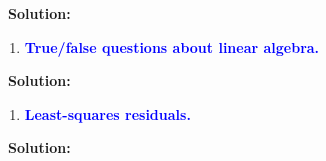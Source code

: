 \documentclass[
  11pt,
]{article}
\providecommand{\tightlist}{%
  \setlength{\itemsep}{0pt}\setlength{\parskip}{0pt}}
\begin{document}
\quad\quad~\textbf{Solution: }

\begin{enumerate}
\def\labelenumi{\arabic{enumi}.}
\setcounter{enumi}{5}
\tightlist
\item
  \textbf{\textcolor{blue}{True/false questions about linear algebra.}}
\end{enumerate}

\quad\quad~\textbf{Solution: }

\begin{enumerate}
\def\labelenumi{\arabic{enumi}.}
\setcounter{enumi}{6}
\tightlist
\item
  \textbf{\textcolor{blue}{Least-squares residuals.}}
\end{enumerate}

\quad\quad~\textbf{Solution: }
\end{document}
